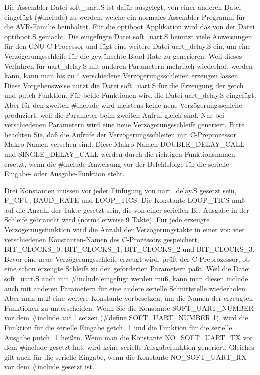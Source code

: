 Die Assembler Datei soft\_uart.S ist dafür ausgelegt,
von einer anderen Datei eingefügt (\#include) zu werden, welche ein
normales Assembler-Programm für die AVR-Familie beinhaltet.
Für die optiboot Applikation wird das von der Datei optiboot.S gemacht.
Die eingefügte Datei soft\_uart.S benutzt viele Anweisungen für den GNU C-Processor
und fügt eine weitere Datei uart\_delay.S ein, um eine Verzögerungsschleife
für die gewünschte Baud-Rate zu generieren.
Weil dieses Verfahren für uart\_delay.S mit anderen Parametern mehrfach wiederholt werden kann,
kann man bis zu 4 verschiedene Verzögerungsschleifen erzeugen lassen.
Diese Vorgehensweise nutzt die Datei soft\_uart.S für die Erzeugung der
getch und putch Funktion. Für beide Funktionen wird die Datei uart\_delay.S
eingefügt. Aber für den zweiten \#include wird meistens keine neue Verzögerungsschleife
produziert, weil die Parameter beim zweiten Aufruf gleich sind.
Nur bei verschiedenen Parametern wird eine neue Verzögerungsschleife generiert.
Bitte beachten Sie, daß die Aufrufe der Verzögerungsschleifen mit C-Preprozessor Makro Namen
versehen sind. Diese Makro Namen DOUBLE\_DELAY\_CALL und SINGLE\_DELAY\_CALL
werden durch die richtigen Funktionsnamen ersetzt, wenn die \#include Anweisung
vor der Befehlsfolge  für die serielle Eingabe- oder Ausgabe-Funktion steht.

Drei Konstanten müssen vor jeder Einfügung von uart\_delay.S gesetzt sein,
F\_CPU, BAUD\_RATE und LOOP\_TICS. Die Konstante LOOP\_TICS muß auf die Anzahl
der Takte gesetzt sein, die von einer seriellen Bit-Ausgabe in der Schleife
gebraucht wird (normalerweise 9 Takte).
Für jede erzeugte Verzögerungsfunktion wird die Anzahl der Verzögerungstakte
in einer von vier verschiedenen Konstanten-Namen des C-Prozessors gespeichert,
BIT\_CLOCKS\_0, BIT\_CLOCKS\_1, BIT\_CLOCKS\_2 und  BIT\_CLOCKS\_3.
Bevor eine neue Verzögerungsschleife erzeugt wird, prüft der C-Preprozessor,
ob eine schon erzeugte Schleife zu den geforderten Parametern paßt.
Weil die Datei soft\_uart.S auch mit \#include eingefügt werden muß,
kann man diesen include auch mit anderen Parametern für eine andere
serielle Schnittstelle wiederholen. Aber man muß eine weitere Konstante
vorbesetzen, um die Namen der erzeugten Funktionen zu unterscheiden.
Wenn Sie die Konstante SOFT\_UART\_NUMBER vor dem \#include
auf 1 setzen (\#define SOFT\_UART\_NUMBER 1), wird die Funktion für die
serielle Eingabe getch\_1 und die Funktion für die serielle Ausgabe putch\_1 heißen.
Wenn man die Konstante NO\_SOFT\_UART\_TX vor dem \#include gesetzt hat,
wird keine serielle Ausgabefunktion generiert.
Gleiches gilt auch für die serielle Eingabe, wenn die Konstante NO\_SOFT\_UART\_RX
vor dem \#include gesetzt ist.

